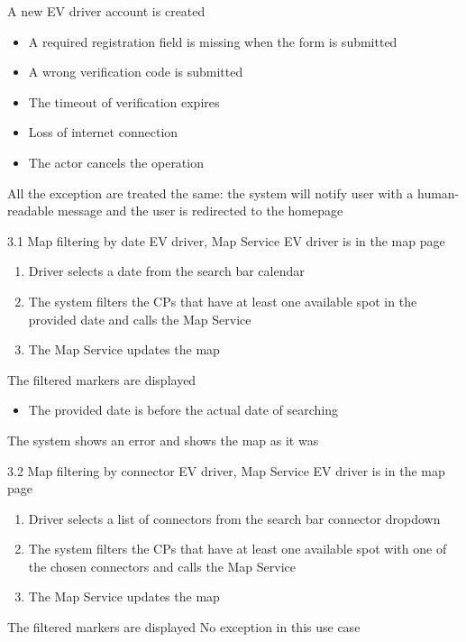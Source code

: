 {A new EV driver account is created}
{
    \begin{itemize}
        \item A required registration field is missing when the form is submitted
        \item A wrong verification code is submitted
        \item The timeout of verification expires
        \item Loss of internet connection
        \item The actor cancels the operation
    \end{itemize}
}
{
    All the exception are treated the same: the system will notify user with a human-readable message and the user is redirected to the homepage
}


\usecase
{

}
{3.1}
{Map filtering by date}
{EV driver, Map Service}
{EV driver is in the map page}
{
    \begin{enumerate}
        \item Driver selects a date from the search bar calendar
        \item The system filters the CPs that have at least one available spot in the provided date and calls the Map Service
        \item The Map Service updates the map
    \end{enumerate}
}
{The filtered markers are displayed}
{
    \begin{itemize}
        \item The provided date is before the actual date of searching
    \end{itemize}
}
{
    The system shows an error and shows the map as it was
}

\usecase
{
}
{3.2}
{Map filtering by connector}
{EV driver, Map Service}
{EV driver is in the map page}
{
    \begin{enumerate}
        \item Driver selects a list of connectors from the search bar connector dropdown
        \item The system filters the CPs that have at least one available spot with one of the chosen connectors and calls the Map Service
        \item The Map Service updates the map
    \end{enumerate}
}
{The filtered markers are displayed}
{
    No exception in this use case
}
{
}

